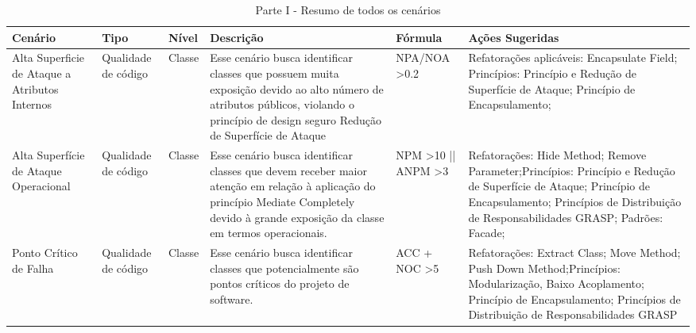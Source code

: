 \begin{landscape}

\begin{table}[H]
\begin{center}
\begin{tabular}{|p{}| p{3cm} | p{2cm} | p{5.5cm} | p{3.5cm}  | p{6cm}  |}
\hline
Cenário                                        & Tipo                & Nível  & Descrição                                                                                                                                                                                 & Fórmula                                    & Ações Sugeridas                                                                                                                                                                                                                                     \\ \hline
Alta Superficie de Ataque a Atributos Internos & Qualidade de código & Classe & Esse cenário busca identificar classes que possuem muita exposição devido ao alto número de atributos públicos, violando o princípio de design seguro Redução de Superfície de Ataque     & NPA/NOA \textgreater 0.2                   & Refatorações aplicáveis: Encapsulate Field; Princípios: Princípio e Redução de Superfície de Ataque; Princípio de Encapsulamento;                                                                                                                   \\ \hline
Alta Superfície de Ataque Operacional          & Qualidade de código & Classe & Esse cenário busca identificar classes que devem receber maior atenção em relação à aplicação do princípio Mediate Completely devido à grande exposição da classe em termos operacionais. & NPM \textgreater 10 || ANPM \textgreater 3 & Refatorações: Hide Method; Remove Parameter;Princípios: Princípio e Redução de Superfície de Ataque; Princípio de Encapsulamento; Princípios de Distribuição de Responsabilidades GRASP; Padrões: Facade;\\ \hline
Ponto Crítico de Falha                         & Qualidade de código & Classe & Esse cenário busca identificar classes que potencialmente são pontos críticos do projeto de software.                                                                                     & ACC + NOC \textgreater 5                   & Refatorações: Extract Class; Move Method; Push Down Method;Princípios: Modularização, Baixo Acoplamento; Princípio de Encapsulamento; Princípios de Distribuição de Responsabilidades GRASP                                                         \\ \hline
\end{tabular}
\caption{Parte I - Resumo de todos os cenários}
		    \label{tab:resumo1}
\end{center}
\end{table}




\end{landscape}
